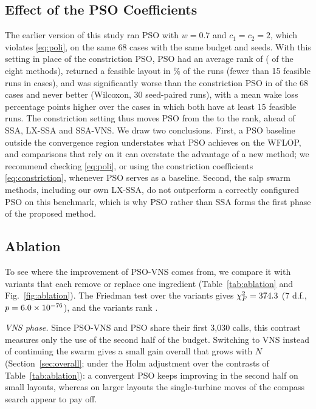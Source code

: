 \documentclass[journal,twoside]{IEEEtran}
\begin{document}
\subsection{Effect of the PSO Coefficients}
\label{sec:psosetting}
The earlier version of this study ran PSO with $w=0.7$ and $c_1=c_2=2$, which violates \eqref{eq:poli}, on the same 68 cases with the same budget and seeds. With this setting in place of the constriction PSO, PSO had an average rank of \NOldPSORank{} (\NOldPSOPos{} of the eight methods), returned a feasible layout in \NOldPSOFeas\% of the runs (fewer than 15 feasible runs in \NOldPSOBelowHalf{} cases), and was significantly worse than the constriction PSO in \NOldPSOWorse{} of the 68 cases and never better (Wilcoxon, 30 seed-paired runs), with a mean wake loss \NOldPSODL{} percentage points higher over the \NOldPSOCases{} cases in which both have at least 15 feasible runs. The constriction setting thus moves PSO from the \NOldPSOPos{} to the \NPSOPos{} rank, ahead of SSA, LX-SSA and SSA-VNS. We draw two conclusions. First, a PSO baseline outside the convergence region understates what PSO achieves on the WFLOP, and comparisons that rely on it can overstate the advantage of a new method; we recommend checking \eqref{eq:poli}, or using the constriction coefficients \eqref{eq:constriction}, whenever PSO serves as a baseline. Second, the salp swarm methods, including our own LX-SSA, do not outperform a correctly configured PSO on this benchmark, which is why PSO rather than SSA forms the first phase of the proposed method.

\subsection{Ablation}
\label{sec:ablation}


To see where the improvement of PSO-VNS comes from, we compare it with variants that each remove or replace one ingredient (Table~\ref{tab:ablation} and Fig.~\ref{fig:ablation}). The Friedman test over the \NAblNVar{} variants gives $\chi^2_F=374.3$ (7 d.f., $p=6.0\times10^{-76}$), and the variants rank \NAblOrder.

\emph{VNS phase.} Since PSO-VNS and PSO share their first 3,030 calls, this contrast measures only the use of the second half of the budget. Switching to VNS instead of continuing the swarm gives a small gain overall that grows with $N$ (Section~\ref{sec:overall}; \NAblPSOVNSvsPSO{} under the Holm adjustment over the contrasts of Table~\ref{tab:ablation}): a convergent PSO keeps improving in the second half on small layouts, whereas on larger layouts the single-turbine moves of the compass search appear to pay off.
\end{document}
